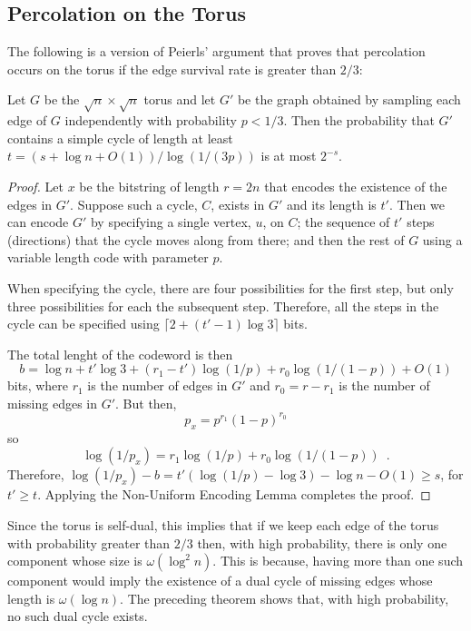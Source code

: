\documentclass{patmorin}
\begin{document}
\subsection{Percolation on the Torus}

The following is a version of Peierls' argument that proves that
percolation occurs on the torus if the edge survival rate is greater
than $2/3$:

\begin{thm}
  Let $G$ be the $\sqrt n\times\sqrt n$ torus and let $G'$ be the graph
  obtained by sampling each edge of $G$ independently with probability
  $p<1/3$.  Then the probability that $G'$ contains a simple cycle of
  length at least $t=(s+\log n+O(1))/\log(1/(3p))$ is at most $2^{-s}$.
\end{thm}

\begin{proof}
  Let $x$ be the bitstring of length $r=2n$ that encodes the existence
  of the edges in $G'$.  Suppose such a cycle, $C$, exists in $G'$
  and its length is $t'$.  Then we can encode $G'$ by specifying a
  single vertex, $u$, on $C$; the sequence of $t'$ steps (directions)
  that the cycle moves along from there; and then the rest of $G$ using
  a variable length code with parameter $p$.

  When specifying the cycle, there are four possibilities for the first
  step, but only three possibilities for each the subsequent step. Therefore,
  all the steps in the cycle can be specified using $\lceil 2+(t'-1)\log
  3\rceil$ bits.

  The total lenght of the codeword is then
  \[
      b = \log n + t'\log 3 + (r_1-t')\log(1/p) + r_0\log(1/(1-p)) + O(1) 
  \]
  bits, where $r_1$ is the number of edges in $G'$ and $r_0=r-r_1$
  is the number of missing edges in $G'$.  But then,
  \[
     p_x = p^{r_1}(1-p)^{r_0}
  \]
  so 
  \[
     \log(1/p_x) = r_1\log(1/p) + r_0\log(1/(1-p)) \enspace .
  \]
  Therefore, $\log(1/p_x)-b = t'(\log(1/p)-\log 3) - \log n - O(1)\ge
  s$, for $t'\ge t$.  Applying the Non-Uniform Encoding Lemma completes
  the proof.
\end{proof}

Since the torus is self-dual, this implies that if we keep each edge of the torus with probability greater than $2/3$ then, with high probability, there is only one component whose size is $\omega(\log^2 n)$.  This is because, having more than one such component would imply the existence of a dual cycle of missing edges whose length is $\omega(\log n)$.  The preceding theorem shows that, with high probability, no such dual cycle exists.
\end{document}
